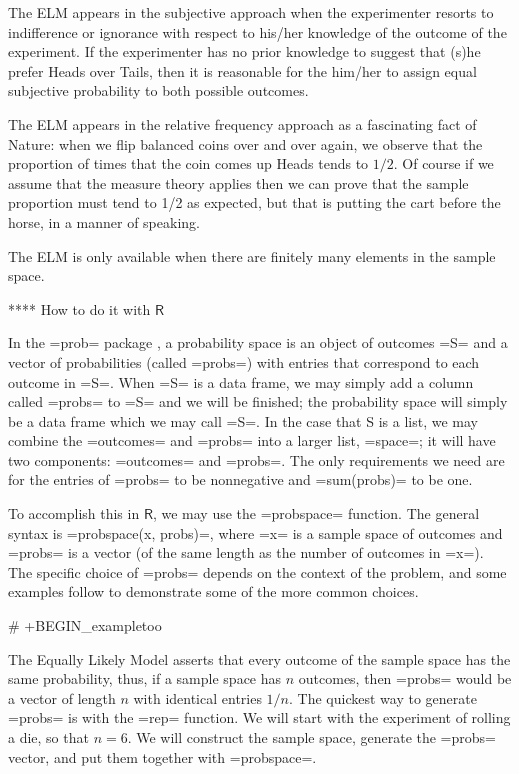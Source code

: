 The ELM appears in the subjective approach when the experimenter
resorts to indifference or ignorance with respect to his/her knowledge
of the outcome of the experiment. If the experimenter has no prior
knowledge to suggest that (s)he prefer Heads over Tails, then it is
reasonable for the him/her to assign equal subjective probability to
both possible outcomes.

The ELM appears in the relative frequency approach as a fascinating
fact of Nature: when we flip balanced coins over and over again, we
observe that the proportion of times that the coin comes up Heads
tends to \(1/2\). Of course if we assume that the measure theory
applies then we can prove that the sample proportion must tend to 1/2
as expected, but that is putting the cart before the horse, in a
manner of speaking.

The ELM is only available when there are finitely many elements in the
sample space.

**** How to do it with \(\mathsf{R}\)

In the =prob= package \cite{prob}, a probability space is an object of
outcomes =S= and a vector of probabilities (called =probs=) with
entries that correspond to each outcome in =S=. When =S= is a data
frame, we may simply add a column called =probs= to =S= and we will be
finished; the probability space will simply be a data frame which we
may call =S=. In the case that S is a list, we may combine the
=outcomes= and =probs= into a larger list, =space=; it will have two
components: =outcomes= and =probs=. The only requirements we need are
for the entries of =probs= to be nonnegative and =sum(probs)= to be
one.

To accomplish this in \(\mathsf{R}\), we may use the =probspace=
function. The general syntax is =probspace(x, probs)=, where =x= is a
sample space of outcomes and =probs= is a vector (of the same length
as the number of outcomes in =x=). The specific choice of =probs=
depends on the context of the problem, and some examples follow to
demonstrate some of the more common choices.

# +BEGIN_exampletoo

The Equally Likely Model asserts that every outcome of the sample
space has the same probability, thus, if a sample space has \(n\)
outcomes, then =probs= would be a vector of length \(n\) with
identical entries \(1/n\). The quickest way to generate =probs= is
with the =rep= function. We will start with the experiment of rolling
a die, so that \(n=6\). We will construct the sample space, generate
the =probs= vector, and put them together with =probspace=.

